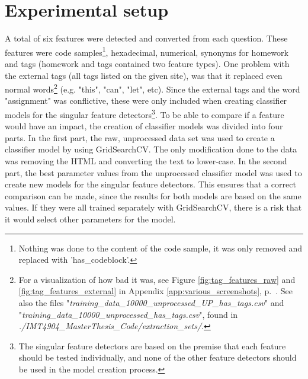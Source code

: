 \label{chap:chapter4}

\section{Experimental setup}
\label{sec:experimental_setup}
A total of six features were detected and converted from each question. 
These features were code samples\footnote{
	Nothing was done to the content of the code sample, it was only removed and replaced with 'has\_codeblock'.
}, 
hexadecimal, numerical, synonyms for homework and tags (homework and tags contained two feature types). 
One problem with the external tags (all tags listed on the given site), was that it replaced even normal words\footnote{
	For a visualization of how bad it was, see Figure \ref{fig:tag_features_raw} and \ref{fig:tag_features_external} in Appendix \ref{app:various_screenshots}, p.~\pageref{app:various_screenshots}.
	See also the files "\emph{training\_data\_10000\_unprocessed\_UP\_has\_tags.csv}" and "\emph{training\_data\_10000\_unprocessed\_has\_tags.csv}", found in \\ 
	\emph{./IMT4904\_MasterThesis\_Code/extraction\_sets/}.
} (e.g. "this", "can", "let", etc).
Since the external tags and the word "assignment" was conflictive, these were only included when creating classifier models for the singular feature detectors\footnote{
	The singular feature detectors are based on the premise that each feature should be tested individually, and none of the other feature detectors should be used in the model creation process.
}.
\vspace{0.5em}\newline
To be able to compare if a feature would have an impact, the creation of classifier models was divided into four parts. 
In the first part, the raw, unprocessed data set was used to create a classifier model by using GridSearchCV. 
The only modification done to the data was removing the HTML and converting the text to lower-case. 
\vspace{0.5em}\newline
In the second part, the best parameter values from the unprocessed classifier model was used to create new models for the singular feature detectors.
This ensures that a correct comparison can be made, since the results for both models are based on the same values. 
If they were all trained separately with GridSearchCV, there is a risk that it would select other parameters for the model.
